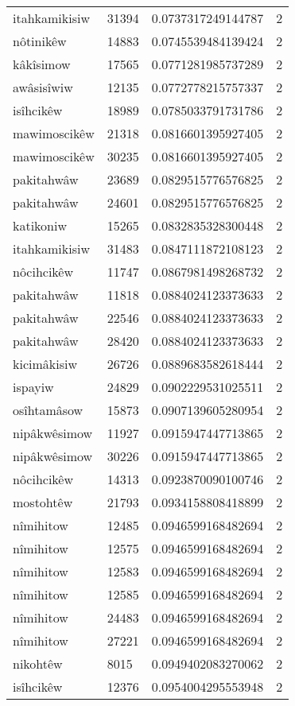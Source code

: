 \begin{longtable}{llll}
itahkamikisiw & 31394 & 0.0737317249144787 & 2 \\
nôtinikêw & 14883 & 0.0745539484139424 & 2 \\
kâkîsimow & 17565 & 0.0771281985737289 & 2 \\
awâsisîwiw & 12135 & 0.0772778215757337 & 2 \\
isîhcikêw & 18989 & 0.0785033791731786 & 2 \\
mawimoscikêw & 21318 & 0.0816601395927405 & 2 \\
mawimoscikêw & 30235 & 0.0816601395927405 & 2 \\
pakitahwâw & 23689 & 0.0829515776576825 & 2 \\
pakitahwâw & 24601 & 0.0829515776576825 & 2 \\
katikoniw & 15265 & 0.0832835328300448 & 2 \\
itahkamikisiw & 31483 & 0.0847111872108123 & 2 \\
nôcihcikêw & 11747 & 0.0867981498268732 & 2 \\
pakitahwâw & 11818 & 0.0884024123373633 & 2 \\
pakitahwâw & 22546 & 0.0884024123373633 & 2 \\
pakitahwâw & 28420 & 0.0884024123373633 & 2 \\
kicimâkisiw & 26726 & 0.0889683582618444 & 2 \\
ispayiw & 24829 & 0.0902229531025511 & 2 \\
osîhtamâsow & 15873 & 0.0907139605280954 & 2 \\
nipâkwêsimow & 11927 & 0.0915947447713865 & 2 \\
nipâkwêsimow & 30226 & 0.0915947447713865 & 2 \\
nôcihcikêw & 14313 & 0.0923870090100746 & 2 \\
mostohtêw & 21793 & 0.0934158808418899 & 2 \\
nîmihitow & 12485 & 0.0946599168482694 & 2 \\
nîmihitow & 12575 & 0.0946599168482694 & 2 \\
nîmihitow & 12583 & 0.0946599168482694 & 2 \\
nîmihitow & 12585 & 0.0946599168482694 & 2 \\
nîmihitow & 24483 & 0.0946599168482694 & 2 \\
nîmihitow & 27221 & 0.0946599168482694 & 2 \\
nikohtêw & 8015 & 0.0949402083270062 & 2 \\
isîhcikêw & 12376 & 0.0954004295553948 & 2 \\

\end{longtable}
